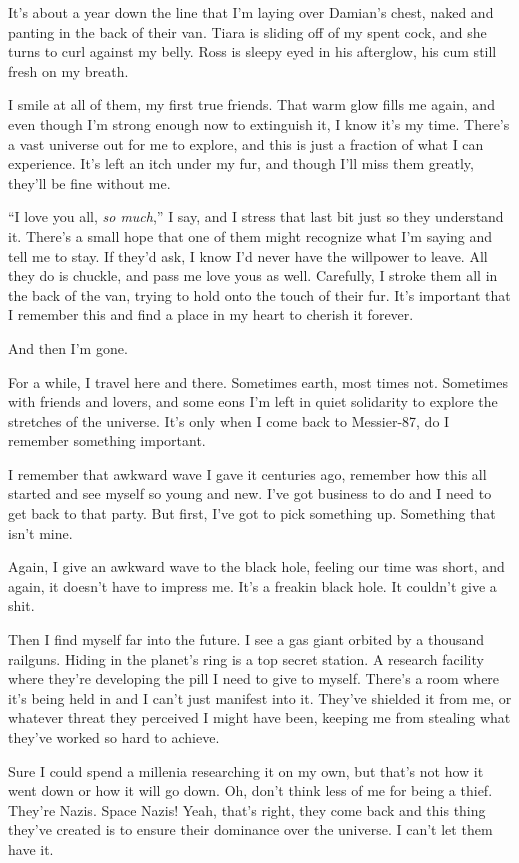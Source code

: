 It's about a year down the line that I'm laying over Damian's chest,
naked and panting in the back of their van. Tiara is sliding off of my
spent cock, and she turns to curl against my belly. Ross is sleepy eyed
in his afterglow, his cum still fresh on my breath.

I smile at all of them, my first true friends. That warm glow fills me
again, and even though I'm strong enough now to extinguish it, I know
it's my time. There's a vast universe out for me to explore, and this is
just a fraction of what I can experience. It's left an itch under my
fur, and though I'll miss them greatly, they'll be fine without me.

``I love you all, \emph{so much},'' I say, and I stress that last bit just
so they understand it. There's a small hope that one of them might
recognize what I'm saying and tell me to stay. If they'd ask, I know I'd
never have the willpower to leave. All they do is chuckle, and pass me
love yous as well. Carefully, I stroke them all in the back of the van,
trying to hold onto the touch of their fur. It's important that I
remember this and find a place in my heart to cherish it forever.

And then I'm gone.

For a while, I travel here and there. Sometimes earth, most times not.
Sometimes with friends and lovers, and some eons I'm left in quiet
solidarity to explore the stretches of the universe. It's only when I
come back to Messier-87, do I remember something important.

I remember that awkward wave I gave it centuries ago, remember how this
all started and see myself so young and new. I've got business to do and
I need to get back to that party. But first, I've got to pick something
up. Something that isn't mine.

Again, I give an awkward wave to the black hole, feeling our time was
short, and again, it doesn't have to impress me. It's a freakin black
hole. It couldn't give a shit.

Then I find myself far into the future. I see a gas giant orbited by a
thousand railguns. Hiding in the planet's ring is a top secret station.
A research facility where they're developing the pill I need to give to
myself. There's a room where it's being held in and I can't just
manifest into it. They've shielded it from me, or whatever threat they
perceived I might have been, keeping me from stealing what they've
worked so hard to achieve.

Sure I could spend a millenia researching it on my own, but that's not
how it went down or how it will go down. Oh, don't think less of me for
being a thief. They're Nazis. Space Nazis! Yeah, that's right, they come
back and this thing they've created is to ensure their dominance over
the universe. I can't let them have it.

